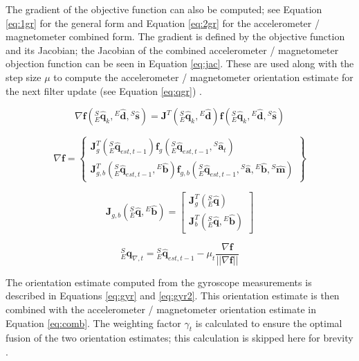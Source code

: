 \documentclass[12pt,a4paper]{report}
\begin{document}
The gradient of the objective function can also be computed; see Equation \ref{eq:1gr} for the general form and Equation \ref{eq:2gr} for the accelerometer / magnetometer combined form. The gradient is defined by the objective function and its Jacobian; the Jacobian of the combined accelerometer / magnetometer objection function can be seen in Equation \ref{eq:jac}. These are used along with the step size \(\mu\) to compute the accelerometer / magnetometer orientation estimate for the next filter update (see Equation \ref{eq:qgr}) \cite{madgwick}.

\begin{equation} \label{eq:1gr}
	\nabla \mathbf{f}({}^S_E\hat{\mathbf{q}}_k, {}^E\hat{\mathbf{d}}, {}^S\hat{\mathbf{s}}) = \mathbf{J}^T({}^S_E\hat{\mathbf{q}}_k, {}^E\hat{\mathbf{d}})\mathbf{f}({}^S_E\hat{\mathbf{q}}_k, {}^E\hat{\mathbf{d}}, {}^S\hat{\mathbf{s}})
\end{equation}

\begin{equation} \label{eq:2gr}
	\nabla \mathbf{f} = \begin{Bmatrix}
		\mathbf{J}_g^T({}^S_E\hat{\mathbf{q}}_{est,t-1})\mathbf{f}_g({}^S_E\hat{\mathbf{q}}_{est,t-1}, {}^S\hat{\mathbf{a}}_t) \\
		\mathbf{J}_{g,b}^T({}^S_E\hat{\mathbf{q}}_{est,t-1}, {}^E\hat{\mathbf{b}}) \mathbf{f}_{g,b}({}^S_E\hat{\mathbf{q}}_{est,t-1}, {}^S\hat{\mathbf{a}}, {}^E\hat{\mathbf{b}}, {}^S\hat{\mathbf{m}})
	\end{Bmatrix}
\end{equation}

\begin{equation} \label{eq:jac}
	\mathbf{J}_{g,b}({}^S_E\hat{\mathbf{q}}, {}^E\hat{\mathbf{b}}) = \begin{bmatrix}
		\mathbf{J}_g^T({}^S_E\hat{\mathbf{q}}) \\
		\mathbf{J}_b^T({}^S_E\hat{\mathbf{q}}, {}^E\hat{\mathbf{b}})
	\end{bmatrix}
\end{equation}

\begin{equation} \label{eq:qgr}
	{}^S_E\mathbf{q}_{\nabla,t} = {}^S_E\hat{\mathbf{q}}_{est,t-1} - \mu_t \frac{\nabla \mathbf{f}}{||\nabla \mathbf{f}||}
\end{equation}

The orientation estimate computed from the gyroscope measurements is described in Equations \ref{eq:gyr} and \ref{eq:gyr2}. This orientation estimate is then combined with the accelerometer / magnetometer orientation estimate in Equation \ref{eq:comb}. The weighting factor \(\gamma_t\) is calculated to ensure the optimal fusion of the two orientation estimates; this calculation is skipped here for brevity \cite{madgwick}.
\end{document}

